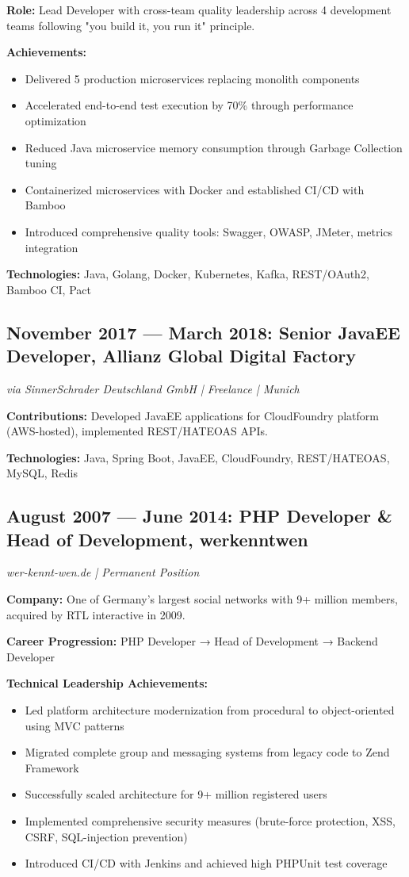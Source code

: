 \documentclass[11pt,a4paper]{article}
\begin{document}
\textbf{Role:} Lead Developer with cross-team quality leadership across 4 development teams following "you build it, you run it" principle.

\textbf{Achievements:}
\begin{itemize}[leftmargin=12pt,topsep=0pt,itemsep=0pt]
\item Delivered 5 production microservices replacing monolith components
\item Accelerated end-to-end test execution by 70\% through performance optimization
\item Reduced Java microservice memory consumption through Garbage Collection tuning
\item Containerized microservices with Docker and established CI/CD with Bamboo
\item Introduced comprehensive quality tools: Swagger, OWASP, JMeter, metrics integration
\end{itemize}

\textbf{Technologies:} Java, Golang, Docker, Kubernetes, Kafka, REST/OAuth2, Bamboo CI, Pact

\subsection{November 2017 — March 2018: Senior JavaEE Developer, Allianz Global Digital Factory}
\textit{via SinnerSchrader Deutschland GmbH | Freelance | Munich}

\textbf{Contributions:} Developed JavaEE applications for CloudFoundry platform (AWS-hosted), implemented REST/HATEOAS APIs.

\textbf{Technologies:} Java, Spring Boot, JavaEE, CloudFoundry, REST/HATEOAS, MySQL, Redis

\subsection{August 2007 — June 2014: PHP Developer \& Head of Development, werkenntwen}
\textit{wer-kennt-wen.de | Permanent Position}

\textbf{Company:} One of Germany's largest social networks with 9+ million members, acquired by RTL interactive in 2009.

\textbf{Career Progression:} PHP Developer → Head of Development → Backend Developer

\textbf{Technical Leadership Achievements:}
\begin{itemize}[leftmargin=12pt,topsep=0pt,itemsep=0pt]
\item Led platform architecture modernization from procedural to object-oriented using MVC patterns
\item Migrated complete group and messaging systems from legacy code to Zend Framework
\item Successfully scaled architecture for 9+ million registered users
\item Implemented comprehensive security measures (brute-force protection, XSS, CSRF, SQL-injection prevention)
\item Introduced CI/CD with Jenkins and achieved high PHPUnit test coverage
\end{itemize}
\end{document}
